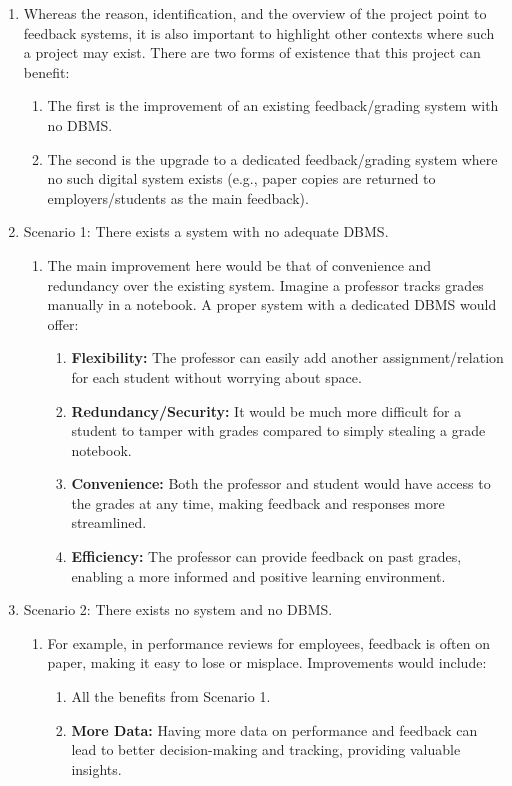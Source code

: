 \documentclass[12pt]{article}
\begin{document}
\begin{enumerate}
    \item Whereas the reason, identification, and the overview of the project point to feedback systems, it is also important to highlight other contexts where such a project may exist. There are two forms of existence that this project can benefit:
    \begin{enumerate}
        \item The first is the improvement of an existing feedback/grading system with no DBMS.
        \item The second is the upgrade to a dedicated feedback/grading system where no such digital system exists (e.g., paper copies are returned to employers/students as the main feedback).
    \end{enumerate}
    \item Scenario 1: There exists a system with no adequate DBMS.
    \begin{enumerate}
        \item The main improvement here would be that of convenience and redundancy over the existing system. Imagine a professor tracks grades manually in a notebook. A proper system with a dedicated DBMS would offer:
        \begin{enumerate}
            \item \textbf{Flexibility:} The professor can easily add another assignment/relation for each student without worrying about space.
            \item \textbf{Redundancy/Security:} It would be much more difficult for a student to tamper with grades compared to simply stealing a grade notebook.
            \item \textbf{Convenience:} Both the professor and student would have access to the grades at any time, making feedback and responses more streamlined.
            \item \textbf{Efficiency:} The professor can provide feedback on past grades, enabling a more informed and positive learning environment.
        \end{enumerate}
    \end{enumerate}
    \item Scenario 2: There exists no system and no DBMS.
    \begin{enumerate}
        \item For example, in performance reviews for employees, feedback is often on paper, making it easy to lose or misplace. Improvements would include:
        \begin{enumerate}
            \item All the benefits from Scenario 1.
            \item \textbf{More Data:} Having more data on performance and feedback can lead to better decision-making and tracking, providing valuable insights.
        \end{enumerate}
    \end{enumerate}
\end{enumerate}
\end{document}
